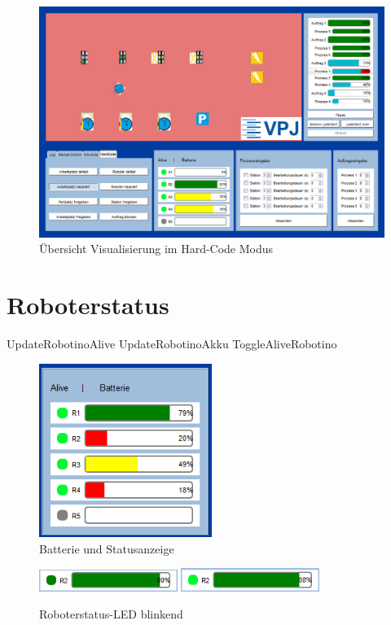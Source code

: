 \begin{figure}[htb]
    \centering
    \includegraphics[width=1\textwidth]{Abbildungen/GesamtprogrammROT.png}
    \caption{Übersicht Visualisierung im Hard-Code Modus}		
    \label{fig:GesamtprogrammROT}
\end{figure}

\section{Roboterstatus}
UpdateRobotinoAlive
UpdateRobotinoAkku
ToggleAliveRobotino
\begin{figure}[htb]
    \centering
    \includegraphics[width=0.5\textwidth]{Abbildungen/Batterie.png}
    \caption{Batterie und Statusanzeige}		
    \label{fig:Batterie}
\end{figure}

\begin{figure}[htb]
    \centering
    \includegraphics[width=0.4\textwidth]{Abbildungen/BatterieAlive1.png}
    \includegraphics[width=0.4\textwidth]{Abbildungen/BatterieAlive2.png}
    \caption{Roboterstatus-LED blinkend}		
    \label{fig:Led}
\end{figure}

